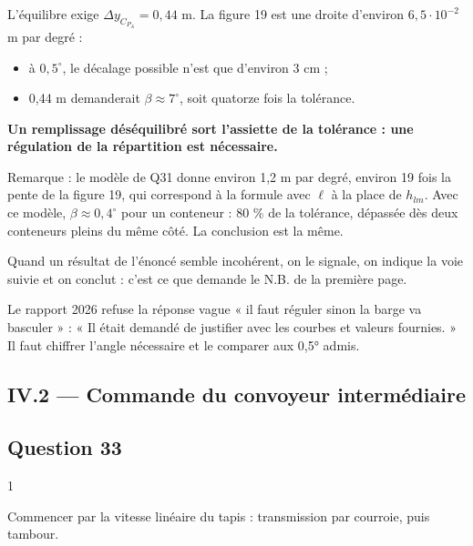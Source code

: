 \documentclass[11pt,a4paper]{article}
\providecommand{\tightlist}{\setlength{\itemsep}{0pt}\setlength{\parskip}{0pt}}
\begin{document}
L'équilibre exige \(\Delta y_{C_{P_A}}=0{,}44\) m. La figure 19 est une droite d'environ \(6{,}5\cdot10^{-2}\) m par degré :

\begin{itemize}
\tightlist
\item
  à \(0{,}5^\circ\), le décalage possible n'est que d'environ 3 cm ;
\item
  0,44 m demanderait \(\beta\approx7^\circ\), soit quatorze fois la tolérance.
\end{itemize}

\textbf{Un remplissage déséquilibré sort l'assiette de la tolérance : une régulation de la répartition est nécessaire.}

Remarque : le modèle de Q31 donne environ 1,2 m par degré, environ 19 fois la pente de la figure 19, qui correspond à la formule avec \(\ell\) à la place de \(h_{lm}\). Avec ce modèle, \(\beta\approx0{,}4^\circ\) pour un conteneur : 80 \% de la tolérance, dépassée dès deux conteneurs pleins du même côté. La conclusion est la même.

\begin{methode}

Quand un résultat de l'énoncé semble incohérent, on le signale, on indique la voie suivie et on conclut : c'est ce que demande le N.B. de la première page.

\end{methode}

\begin{jury}

Le rapport 2026 refuse la réponse vague « il faut réguler sinon la barge va basculer » : « Il était demandé de justifier avec les courbes et valeurs fournies. » Il faut chiffrer l'angle nécessaire et le comparer aux 0,5° admis.

\end{jury}

\hypertarget{iv.2-commande-du-convoyeur-intermuxe9diaire}{%
\subsection{IV.2 --- Commande du convoyeur intermédiaire}\label{iv.2-commande-du-convoyeur-intermuxe9diaire}}

\hypertarget{question-33}{%
\subsection{Question 33}\label{question-33}}

\begin{indication}{1}

Commencer par la vitesse linéaire du tapis : transmission par courroie, puis tambour.

\end{indication}
\end{document}
